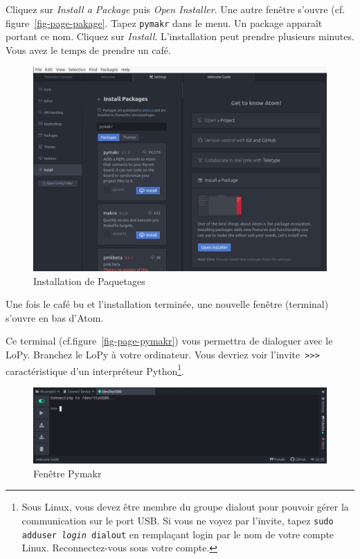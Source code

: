 Cliquez sur \textit{Install a Package} puis \textit{Open Installer}. Une autre fenêtre s’ouvre (cf. figure~\vref{fig-page-pakage}. Tapez \texttt{pymakr} dans le menu. Un package apparaît portant ce nom. Cliquez sur \textit{Install}. L’installation peut prendre plusieurs minutes. Vous avez le temps de prendre un café.

\begin{figure}[tbp]
\centerline{\includegraphics[width=1\columnwidth]{Pictures/atom_pymakr.png}}
\caption{Installation de Paquetages}
\label{fig-page-pakage}
\end{figure}

     \vspace{1em}

Une fois le café bu et l’installation terminée, une nouvelle fenêtre (terminal) s’ouvre en bas d’Atom.

     \vspace{1em}

Ce terminal (cf.figure~\vref{fig-page-pymakr}) vous permettra de dialoguer avec le LoPy.
Branchez le LoPy à votre ordinateur.
Vous devriez voir l’invite\texttt{ >{}>{}>{}} caractéristique d’un interpréteur Python\footnote{Sous Linux, vous devez être membre du groupe dialout pour pouvoir gérer la communication sur le port USB. 
Si vous ne voyez par l’invite, tapez \texttt{sudo adduser \textit{login} dialout} en remplaçant login par le nom de votre compte Linux. Reconnectez-vous sous votre compte.}.

     \vspace{1em}

\begin{figure}[tbp]
\centerline{\includegraphics[width=1\columnwidth]{Pictures/atom_pymakr1.png}}
\caption{Fenêtre Pymakr}
\label{fig-page-pymakr}
\end{figure}

